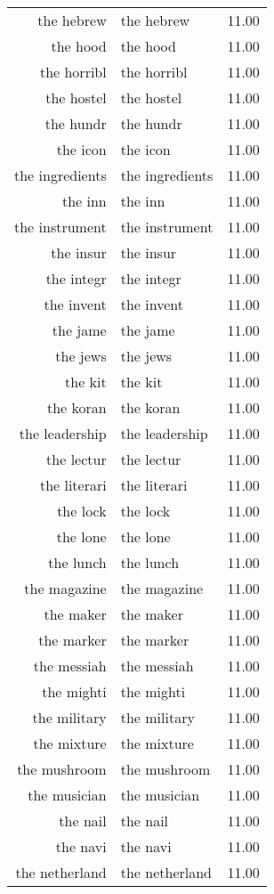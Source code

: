 \begin{table}[ht]
\begin{tabular}{rlr}
  the hebrew & the hebrew & 11.00 \\ 
  the hood & the hood & 11.00 \\ 
  the horribl & the horribl & 11.00 \\ 
  the hostel & the hostel & 11.00 \\ 
  the hundr & the hundr & 11.00 \\ 
  the icon & the icon & 11.00 \\ 
  the ingredients & the ingredients & 11.00 \\ 
  the inn & the inn & 11.00 \\ 
  the instrument & the instrument & 11.00 \\ 
  the insur & the insur & 11.00 \\ 
  the integr & the integr & 11.00 \\ 
  the invent & the invent & 11.00 \\ 
  the jame & the jame & 11.00 \\ 
  the jews & the jews & 11.00 \\ 
  the kit & the kit & 11.00 \\ 
  the koran & the koran & 11.00 \\ 
  the leadership & the leadership & 11.00 \\ 
  the lectur & the lectur & 11.00 \\ 
  the literari & the literari & 11.00 \\ 
  the lock & the lock & 11.00 \\ 
  the lone & the lone & 11.00 \\ 
  the lunch & the lunch & 11.00 \\ 
  the magazine & the magazine & 11.00 \\ 
  the maker & the maker & 11.00 \\ 
  the marker & the marker & 11.00 \\ 
  the messiah & the messiah & 11.00 \\ 
  the mighti & the mighti & 11.00 \\ 
  the military & the military & 11.00 \\ 
  the mixture & the mixture & 11.00 \\ 
  the mushroom & the mushroom & 11.00 \\ 
  the musician & the musician & 11.00 \\ 
  the nail & the nail & 11.00 \\ 
  the navi & the navi & 11.00 \\ 
  the netherland & the netherland & 11.00 \\ 

\end{tabular}
\end{table}
